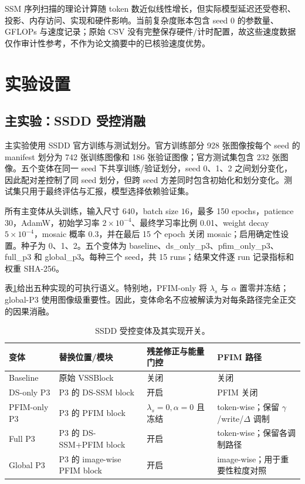 \documentclass[UTF8,12pt,a4paper]{ctexart}
\begin{document}
SSM 序列扫描的理论计算随 token 数近似线性增长，但实际模型延迟还受卷积、投影、内存访问、实现和硬件影响。当前复杂度账本包含 seed 0 的参数量、GFLOPs 与速度记录；原始 CSV 没有完整保存硬件/计时配置，故这些速度数据仅作审计性参考，不作为论文摘要中的已核验速度优势。

\section{实验设置}
\subsection{主实验：SSDD 受控消融}
主实验使用 SSDD 官方训练与测试划分。官方训练部分 928 张图像按每个 seed 的 manifest 划分为 742 张训练图像和 186 张验证图像；官方测试集包含 232 张图像。五个变体在同一 seed 下共享训练/验证划分，seed 0、1、2 之间划分变化，因此配对差控制了同 seed 划分，但跨 seed 方差同时包含初始化和划分变化。测试集只用于最终评估与汇报，模型选择依赖验证集。

所有主变体从头训练，输入尺寸 $640$，batch size $16$，最多 150 epochs，patience 30，AdamW，初始学习率 $2\times10^{-4}$、最终学习率比例 0.01、weight decay $5\times10^{-4}$，mosaic 概率 0.3，并在最后 15 个 epoch 关闭 mosaic；启用确定性设置。种子为 0、1、2。五个变体为 baseline、ds\_only\_p3、pfim\_only\_p3、full\_p3 和 global\_p3。每种三个 seed，共 15 runs；结果文件逐 run 记录指标和权重 SHA-256。

表\ref{tab:variants}给出五种实现的可执行语义。特别地，PFIM-only 将 $\lambda_s$ 与 $\alpha$ 置零并冻结；global-P3 使用图像级重要性。因此，变体命名不应被解读为对每条路径完全正交的因果消融。
\begin{table}[H]\centering\scriptsize
\caption{SSDD 受控变体及其实现开关。}
\label{tab:variants}
\begin{tabularx}{\linewidth}{p{2.5cm}p{3.2cm}p{3.0cm}X}
\toprule
变体 & 替换位置/模块 & 残差修正与能量门控 & PFIM 路径\\
\midrule
Baseline & 原始 VSSBlock & 关闭 & 关闭\\
DS-only P3 & P3 的 DS-SSM block & 开启 & PFIM 关闭\\
PFIM-only P3 & P3 的 PFIM block & $\lambda_s=0,\alpha=0$ 且冻结 & token-wise；保留 $\gamma$/write/$\Delta$ 调制\\
Full P3 & P3 的 DS-SSM+PFIM block & 开启 & token-wise；保留各调制路径\\
Global P3 & P3 的 image-wise PFIM block & 开启 & image-wise；用于重要性粒度对照\\
\bottomrule
\end{tabularx}
\end{table}
\end{document}
